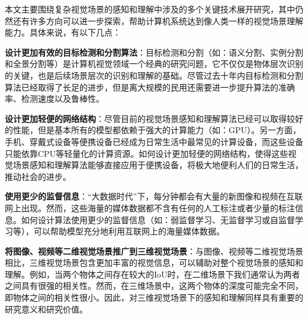 本文主要围绕复杂视觉场景的感知和理解中涉及的多个关键技术展开研究，其中仍然还有许多方向可以进一步探索，帮助计算机系统达到像人类一样的视觉场景理解能力。具体来说，有以下几点：
\begin{asparaenum}
\item \textbf{设计更加有效的目标检测和分割算法}：目标检测和分割（如：语义分割、实例分割和全景分割等）是计算机视觉领域一个经典的研究问题，它不仅仅是物体层次识别的关键，也是后续场景层次的识别和理解的基础。尽管过去十年内目标检测和分割算法已经取得了长足的进步，但是离大规模的民用还需要进一步提升算法的准确率、检测速度以及鲁棒性。

\item \textbf{设计更加轻便的网络结构}：尽管目前的视觉场景感知和理解算法已经可以取得较好的性能，但是基本所有的模型都依赖于强大的计算能力（如：GPU）。另一方面，手机、穿戴式设备等便携设备已经成为日常生活中最常见的计算设备，而这些设备只能依靠CPU等轻量化的计算资源。如何设计更加轻便的网络结构，使得这些视觉场景感知和理解算法能够直接应用于便携设备，将极大地便利人们的日常生活，推动社会的进步。

\item \textbf{使用更少的监督信息}：“大数据时代”下，每分钟都会有大量的新图像和视频在互联网上出现。然而，这些海量的媒体数据都不含有任何的人工标注或者少量的标注信息。如何设计算法使用更少的监督信息（如：弱监督学习、无监督学习或自监督学习等），可以帮助模型充分地利用互联网上的海量媒体数据。

\item \textbf{将图像、视频等二维视觉场景推广到三维视觉场景}：与图像、视频等二维视觉场景相比，三维视觉场景包含更加丰富的视觉信息，可以辅助对整个视觉场景的感知和理解。例如，当两个物体之间存在较大的IoU时，在二维场景下我们通常认为两者之间具有很强的相关性。然而，在三维场景中，这两个物体的深度可能完全不同，即物体之间的相关性很小。因此，对三维视觉场景下的感知和理解同样具有重要的研究意义和研究价值。

\end{asparaenum}
